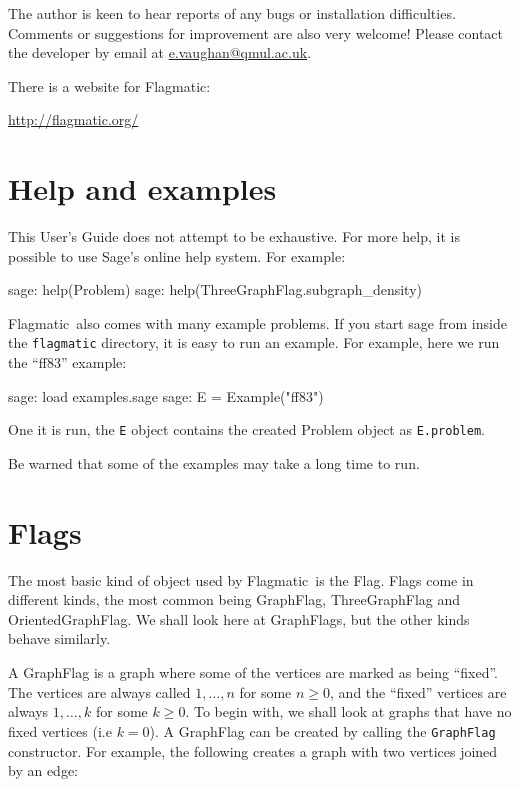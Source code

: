 \documentclass{article}
\providecommand{\flagmatic}{Flagmatic}
\begin{document}
The author is keen to hear reports of any bugs or installation difficulties. Comments or suggestions for improvement are also very welcome! Please contact the developer by email at \url{e.vaughan@qmul.ac.uk}.

There is a website for \flagmatic:

\url{http://flagmatic.org/}


\section{Help and examples}

This User's Guide does not attempt to be exhaustive. For more help, it is possible to use Sage's online help system. For example:

\begin{sage}
sage: help(Problem)
sage: help(ThreeGraphFlag.subgraph_density)
\end{sage}

\flagmatic\ also comes with many example problems. If you start sage from inside the \verb|flagmatic| directory, it is easy to run an example. For example, here we run the ``ff83'' example:

\begin{sage}
sage: load examples.sage
sage: E = Example("ff83")
\end{sage}

One it is run, the \verb|E| object contains the created Problem object as \verb|E.problem|.

Be warned that some of the examples may take a long time to run.

\section{Flags}

The most basic kind of object used by \flagmatic\ is the Flag. Flags come in different kinds, the most common being GraphFlag, ThreeGraphFlag and OrientedGraphFlag. We shall look here at GraphFlags, but the other kinds behave similarly.

A GraphFlag is a graph where some of the vertices are marked as being ``fixed''. The vertices are always called $1, \dots, n$ for some $n \ge 0$, and the ``fixed'' vertices are always $1, \dots, k$ for some $k \ge 0$. To begin with, we shall look at graphs that have no fixed vertices (i.{e} $k=0$). A GraphFlag can be created by calling the \verb|GraphFlag| constructor. For example, the following creates a graph with two vertices joined by an edge:
\end{document}
